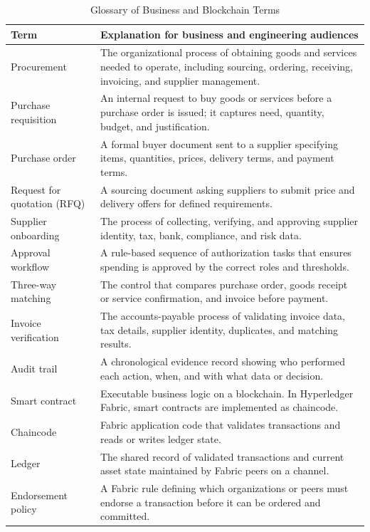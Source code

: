 \documentclass[conference]{IEEEtran}
\begin{document}
\begin{table}[t]
\caption{Glossary of Business and Blockchain Terms}
\label{tab:glossary}
\scriptsize
\begin{tabularx}{\textwidth}{|L{3.0cm}|Y|}
\hline
\textbf{Term} & \textbf{Explanation for business and engineering audiences} \\ \hline
Procurement & The organizational process of obtaining goods and services needed to operate, including sourcing, ordering, receiving, invoicing, and supplier management. \\ \hline
Purchase requisition & An internal request to buy goods or services before a purchase order is issued; it captures need, quantity, budget, and justification. \\ \hline
Purchase order & A formal buyer document sent to a supplier specifying items, quantities, prices, delivery terms, and payment terms. \\ \hline
Request for quotation (RFQ) & A sourcing document asking suppliers to submit price and delivery offers for defined requirements. \\ \hline
Supplier onboarding & The process of collecting, verifying, and approving supplier identity, tax, bank, compliance, and risk data. \\ \hline
Approval workflow & A rule-based sequence of authorization tasks that ensures spending is approved by the correct roles and thresholds. \\ \hline
Three-way matching & The control that compares purchase order, goods receipt or service confirmation, and invoice before payment. \\ \hline
Invoice verification & The accounts-payable process of validating invoice data, tax details, supplier identity, duplicates, and matching results. \\ \hline
Audit trail & A chronological evidence record showing who performed each action, when, and with what data or decision. \\ \hline
Smart contract & Executable business logic on a blockchain. In Hyperledger Fabric, smart contracts are implemented as chaincode. \\ \hline
Chaincode & Fabric application code that validates transactions and reads or writes ledger state. \\ \hline
Ledger & The shared record of validated transactions and current asset state maintained by Fabric peers on a channel. \\ \hline
Endorsement policy & A Fabric rule defining which organizations or peers must endorse a transaction before it can be ordered and committed. \\ \hline

\end{tabularx}
\end{table}
\end{document}
